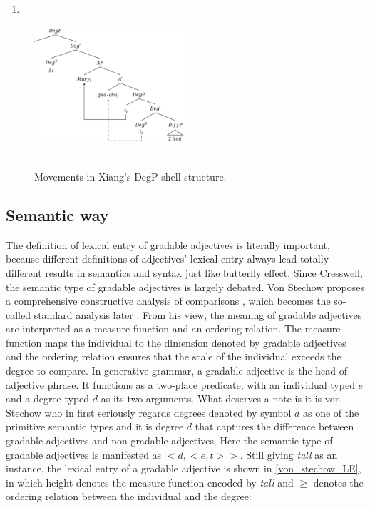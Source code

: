\documentclass{ctexart}
\let \cite \parencite
\begin{document}
\begin{enumerate}
    \item \label{xiang_structure}
\end{enumerate}

\begin{figure}[H]
    \centering
    \includegraphics[width=0.5\textwidth]{pic/xiang.png}
    \begin{caption}
        \\ \vspace{-1.1ex}
        Movements in Xiang's DegP-shell structure.
    \end{caption}
\end{figure}


\subsection{Semantic way}

The definition of lexical entry of gradable adjectives is literally important, because different definitions of adjectives' lexical entry always lead totally different results in semantics and syntax just like butterfly effect. Since Cresswell, the semantic type of gradable adjectives is largely debated. Von Stechow proposes a comprehensive constructive analysis of comparisons \cite{von1984a}, which becomes the so-called standard analysis later \cite{bale2011}. From his view, the meaning of gradable adjectives are interpreted as a measure function and an ordering relation. The measure function maps the individual to the dimension denoted by gradable adjectives and the ordering relation ensures that the scale of the individual exceeds the degree to compare. In generative grammar, a gradable adjective is the head of adjective phrase. It functions as a two-place predicate, with an individual typed $e$ and a degree typed $d$ as its two arguments. What deserves a note is it is von Stechow who in first seriously regards degrees denoted by symbol $d$ as one of the primitive semantic types and it is degree $d$ that captures the difference between gradable adjectives and non-gradable adjectives. Here the semantic type of gradable adjectives is manifested as $<d,<e,t>>$. Still giving \textit{tall} as an instance, the lexical entry of a gradable adjective is shown in \ref{von_stechow_LE}, in which height denotes the measure function encoded by \textit{tall} and $\geq$ denotes the ordering relation between the individual and the degree:
\end{document}

